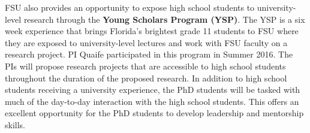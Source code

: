 \documentclass[11pt]{article}
\begin{document}
FSU also provides an opportunity to expose high school students to university-level research through the {\bf Young Scholars Program (YSP)}. The YSP is a six week experience that brings Florida's brightest grade 11 students to FSU where they are exposed to university-level lectures and work with FSU faculty on a research project. PI Quaife participated in this program in Summer 2016. The PIs will propose research projects that are accessible to high school students throughout the duration of the proposed research. In addition to high school students receiving a university experience, the PhD students will be tasked with much of the day-to-day interaction with the high school students. This offers an excellent opportunity for the PhD students to develop leadership and mentorship skills.


\newpage
\setcounter{page}{1}

%

\end{document}
